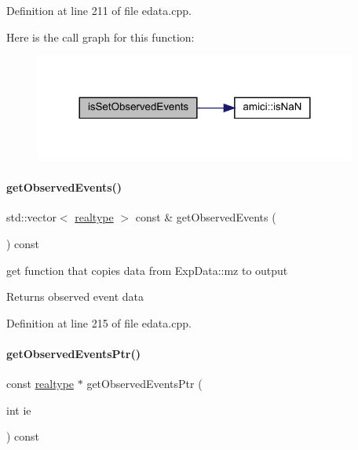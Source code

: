 Definition at line 211 of file edata.\+cpp.

Here is the call graph for this function\+:
\nopagebreak
\begin{figure}[H]
\begin{center}
\leavevmode
\includegraphics[width=300pt]{classamici_1_1_exp_data_a7270ea1362212e4dc344e24dc01b70ee_cgraph}
\end{center}
\end{figure}
\mbox{\label{classamici_1_1_exp_data_a4f70119553de7d120b14600d7a6d5267}} 
\paragraph{\texorpdfstring{getObservedEvents()}{getObservedEvents()}}
{\footnotesize\ttfamily std\+::vector$<$ \mbox{\hyperlink{namespaceamici_a1bdce28051d6a53868f7ccbf5f2c14a3}{realtype}} $>$ const  \& get\+Observed\+Events (\begin{DoxyParamCaption}{ }\end{DoxyParamCaption}) const}

get function that copies data from Exp\+Data\+::mz to output

\begin{DoxyReturn}{Returns}
observed event data 
\end{DoxyReturn}


Definition at line 215 of file edata.\+cpp.

\mbox{\label{classamici_1_1_exp_data_a95ab3fe91af62612f202fdc6cd033d2a}} 
\paragraph{\texorpdfstring{getObservedEventsPtr()}{getObservedEventsPtr()}}
{\footnotesize\ttfamily const \mbox{\hyperlink{namespaceamici_a1bdce28051d6a53868f7ccbf5f2c14a3}{realtype}} $\ast$ get\+Observed\+Events\+Ptr (\begin{DoxyParamCaption}\item[{int}]{ie }\end{DoxyParamCaption}) const}

